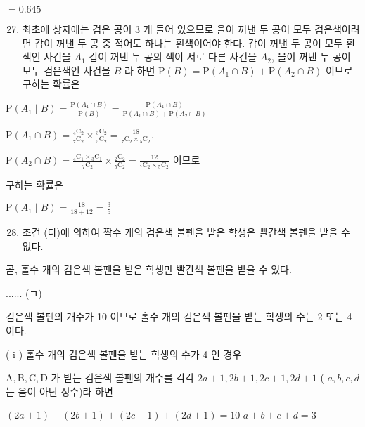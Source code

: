 \documentclass[10pt]{article}
\begin{document}
$=0.645$

\begin{enumerate}
  \setcounter{enumi}{26}
  \item 최초에 상자에는 검은 공이 3 개 들어 있으므로 을이 꺼낸 두 공이 모두 검은색이려면 갑이 꺼낸 두 공 중 적어도 하나는 흰색이어야 한다. 갑이 꺼낸 두 공이 모두 흰색인 사건을 $A_{1}$ 갑이 꺼낸 두 공의 색이 서로 다른 사건을 $A_{2}$, 을이 꺼낸 두 공이 모두 검은색인 사건을 $B$ 라 하면 $\mathrm{P}(B)=\mathrm{P}\left(A_{1} \cap B\right)+\mathrm{P}\left(A_{2} \cap B\right)$ 이므로 구하는 확률은
\end{enumerate}

$\mathrm{P}\left(A_{1} \mid B\right)=\frac{\mathrm{P}\left(A_{1} \cap B\right)}{\mathrm{P}(B)}=\frac{\mathrm{P}\left(A_{1} \cap B\right)}{\mathrm{P}\left(A_{1} \cap B\right)+\mathrm{P}\left(A_{2} \cap B\right)}$

$\mathrm{P}\left(A_{1} \cap B\right)=\frac{{ }_{4} \mathrm{C}_{2}}{{ }_{7} \mathrm{C}_{2}} \times \frac{{ }_{3} \mathrm{C}_{2}}{{ }_{5} \mathrm{C}_{2}}=\frac{18}{{ }_{7} \mathrm{C}_{2} \times{ }_{5} \mathrm{C}_{2}}$,

$\mathrm{P}\left(A_{2} \cap B\right)=\frac{{ }_{4} \mathrm{C}_{1} \times{ }_{3} \mathrm{C}_{1}}{{ }_{7} \mathrm{C}_{2}} \times \frac{{ }_{2} \mathrm{C}_{2}}{{ }_{5} \mathrm{C}_{2}}=\frac{12}{{ }_{7} \mathrm{C}_{2} \times{ }_{5} \mathrm{C}_{2}}$ 이므로

구하는 확률은

$\mathrm{P}\left(A_{1} \mid B\right)=\frac{18}{18+12}=\frac{3}{5}$

\begin{enumerate}
  \setcounter{enumi}{27}
  \item 조건 (다)에 의하여 짝수 개의 검은색 볼펜을 받은 학생은 빨간색 볼펜을 받을 수 없다.
\end{enumerate}

곧, 홀수 개의 검은색 볼펜을 받은 학생만 빨간색 볼펜을 받을 수 있다.

...... (ㄱ)

검은색 볼펜의 개수가 10 이므로 홀수 개의 검은색 볼펜을 받는 학생의 수는 2 또는 4 이다.

( i ) 홀수 개의 검은색 볼펜을 받는 학생의 수가 4 인 경우

$\mathrm{A}, \mathrm{B}, \mathrm{C}, \mathrm{D}$ 가 받는 검은색 볼펜의 개수를 각각 $2 a+1,2 b+1,2 c+1,2 d+1$ ( $a, b, c, d$ 는 음이 아닌 정수)라 하면

$(2 a+1)+(2 b+1)+(2 c+1)+(2 d+1)=10$ $a+b+c+d=3$
\end{document}
